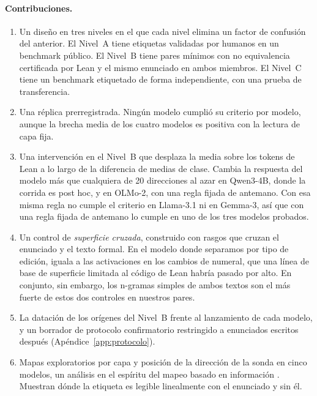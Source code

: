 \documentclass[10pt]{article}
\begin{document}
\paragraph{Contribuciones.}
\begin{enumerate}
\item Un diseño en tres niveles en el que cada nivel elimina un factor de confusión del anterior. El Nivel~A tiene
etiquetas validadas por humanos en un benchmark público. El Nivel~B tiene pares mínimos con no equivalencia
certificada por Lean y el mismo enunciado en ambos miembros. El Nivel~C tiene un benchmark etiquetado de forma
independiente, con una prueba de transferencia.
\item Una réplica prerregistrada. Ningún modelo cumplió su criterio por modelo, aunque la brecha media de los cuatro
modelos es positiva con la lectura de capa fija.
\item Una intervención en el Nivel~B que desplaza la media sobre los tokens de Lean a lo largo de la diferencia de
medias de clase. Cambia la respuesta del modelo más que cualquiera de 20 direcciones al azar en Qwen3-4B, donde la corrida es post
hoc, y en OLMo-2, con una regla fijada de antemano. Con esa misma regla no cumple el criterio en Llama-3.1 ni en
Gemma-3, así que con una regla fijada de antemano lo cumple en uno de los tres modelos probados.
\item Un control de \emph{superficie cruzada}, construido con rasgos que cruzan el enunciado y el texto formal. En el
modelo donde separamos por tipo de edición, iguala a las activaciones en los cambios de numeral, que una línea de
base de superficie limitada al código de Lean habría pasado por alto. En conjunto, sin embargo, los n-gramas simples de ambos
textos son el más fuerte de estos dos controles en nuestros pares.
\item La datación de los orígenes del Nivel~B frente al lanzamiento de cada modelo, y un borrador de protocolo
confirmatorio restringido a enunciados escritos después (Apéndice~\ref{app:protocolo}).
\item Mapas exploratorios por capa y posición de la dirección de la sonda en cinco modelos, un análisis en el
espíritu del mapeo basado en información \citep{searchlight}. Muestran dónde la etiqueta es legible linealmente con
el enunciado y sin él.
\end{enumerate}
\end{document}
